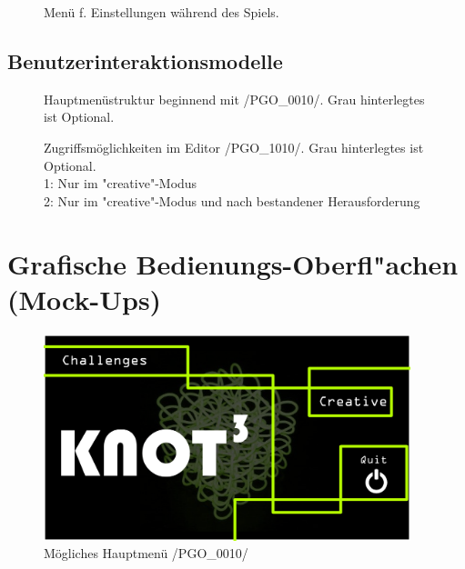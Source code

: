 	\begin{figure}[!ht]
		  \centering
		  
		  \caption{Menü f. Einstellungen während des Spiels.}
	\end{figure}

	
\clearpage

\begin{landscape}

	\section{Benutzerinteraktionsmodelle}

	\begin{figure}[!h]
		\centering
	 	
	 	\caption{Hauptmenüstruktur beginnend mit /PGO\_0010/. Grau hinterlegtes ist Optional.}
	\end{figure}
	
\end{landscape}

\clearpage

\begin{landscape}

	\begin{figure}[h]
		\centering
	 	
	 	\caption{Zugriffsmöglichkeiten im Editor /PGO\_1010/. Grau hinterlegtes ist Optional.\\\hspace{\textwidth}
			1: Nur im "creative"-Modus\\\hspace{\textwidth}
			2: Nur im "creative"-Modus und nach bestandener Herausforderung}
		\label{fig:ingamemenu}
	\end{figure}
	
\end{landscape}
	
\clearpage



%
%
%
\section{Grafische Bedienungs-Oberfl{"a}chen (Mock-Ups)}
	
	\begin{figure}[ht]
	  \centering
	  \includegraphics[width = 0.95\textwidth]{Inhalt/Nutzung/Grafiken/Grafische_Oberflaechen/01_Knot3-mainscreen.png}
	  \caption{Mögliches Hauptmenü /PGO\_0010/}
	  \label{fig:mainscreen}
	\end{figure}

